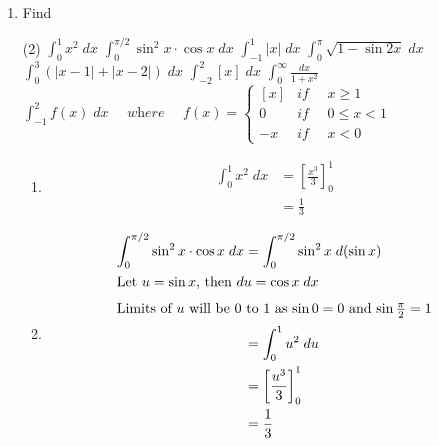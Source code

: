 \BgThispage
\begin{enumerate}
    \item Find
        \begin{tasks}(2)
            \task $\int_0^1 x^2 \; dx$
            \task $\int_{0}^{\pi/2} \sin^2 x \cdot \cos x \; dx$
            \task $\int_{-1}^1 |x| \; dx$
            \task $\int_0^\pi \sqrt{1 - \sin 2x} \; dx$
            \task $\int_0^3 (|x - 1| + |x - 2|) \; dx$
            \task $\int_{-2}^2 [x] \; dx$
            \task $\int_0^\infty \frac{dx}{1 + x^2}$
            \task $\int_{-1}^2 f(x) \; dx \quad\textit{ where } \quad f(x)= \begin{cases}
                [x] & \textit{if }\quad x \geq 1\\
                0 & \textit{if } \quad 0 \leq x < 1\\
                -x & \textit{if } \quad x < 0
            \end{cases}$
        \end{tasks}
           \begin{solution}
            \begin{enumerate}
                \item 
                    \begin{align*}
                        \int_0^1 x^2 \; dx &= \left[\frac{x^3}{3}\right]_0^1\\
                        &= \frac{1}{3}
                    \end{align*}

                \item
                    \begin{align*}
                        \int_{0}^{\pi/2} \sin^2 x \cdot \cos x \; dx &= \int_{0}^{\pi/2} \sin^2 x \; d(\sin x)\\
                        \intertext{Let \( u = \sin x \), then \( du = \cos x \; dx \)}
                        \intertext{Limits of \( u \) will be \( 0 \) to \( 1 \) as \( \sin 0 = 0 \) and \( \sin \frac{\pi}{2} = 1 \)}
                        &= \int_{0}^{1} u^2 \; du\\
                        &= \left[\frac{u^3}{3}\right]_0^1\\
                        &= \frac{1}{3}
                    \end{align*}


\end{enumerate}
\end{solution}
\end{enumerate}
